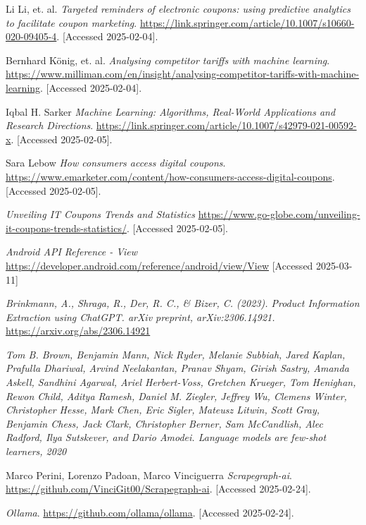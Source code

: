\documentclass[licencjacka,en]{pracamgr}
\begin{document}
\begin{thebibliography}{99}
Li Li, et. al.
\textit{Targeted reminders of electronic coupons: using predictive analytics to facilitate coupon marketing}.
\url{https://link.springer.com/article/10.1007/s10660-020-09405-4}.
[Accessed 2025-02-04].

Bernhard König, et. al.
\textit{Analysing competitor tariffs with machine learning}.
\url{https://www.milliman.com/en/insight/analysing-competitor-tariffs-with-machine-learning}.
[Accessed 2025-02-04].

Iqbal H. Sarker
\textit{Machine Learning: Algorithms, Real-World Applications and Research Directions}.
\url{https://link.springer.com/article/10.1007/s42979-021-00592-x}.
[Accessed 2025-02-05].

Sara Lebow
\textit{How consumers access digital coupons}.
\url{https://www.emarketer.com/content/how-consumers-access-digital-coupons}.
[Accessed 2025-02-05].

\textit{Unveiling IT Coupons Trends and Statistics}
\url{https://www.go-globe.com/unveiling-it-coupons-trends-statistics/}.
[Accessed 2025-02-05].

\textit{Android API Reference - View}
\url{https://developer.android.com/reference/android/view/View}
[Accessed 2025-03-11]

\textit{Brinkmann, A., Shraga, R., Der, R. C., \& Bizer, C. (2023). Product Information Extraction using ChatGPT. arXiv preprint, arXiv:2306.14921.}
\url{https://arxiv.org/abs/2306.14921}

\textit{Tom B. Brown, Benjamin Mann, Nick Ryder, Melanie Subbiah, Jared
Kaplan, Prafulla Dhariwal, Arvind Neelakantan, Pranav Shyam, Girish
Sastry, Amanda Askell, Sandhini Agarwal, Ariel Herbert-Voss, Gretchen
Krueger, Tom Henighan, Rewon Child, Aditya Ramesh, Daniel M.
Ziegler, Jeffrey Wu, Clemens Winter, Christopher Hesse, Mark Chen,
Eric Sigler, Mateusz Litwin, Scott Gray, Benjamin Chess, Jack Clark,
Christopher Berner, Sam McCandlish, Alec Radford, Ilya Sutskever, and
Dario Amodei. Language models are few-shot learners, 2020}

Marco Perini, Lorenzo Padoan, Marco Vinciguerra
\textit{Scrapegraph-ai}.
\url{https://github.com/VinciGit00/Scrapegraph-ai}.
[Accessed 2025-02-24].

\textit{Ollama}.
\url{https://github.com/ollama/ollama}.
[Accessed 2025-02-24].


\end{thebibliography}
\end{document}
